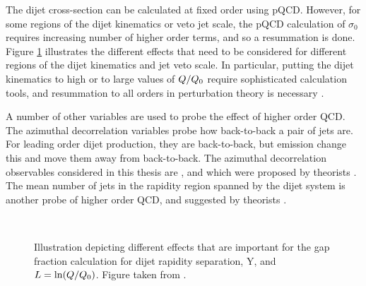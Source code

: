 The dijet cross-section can be calculated at fixed order using pQCD.
However, for some regions of the dijet kinematics or veto jet scale, the pQCD calculation of $\sigma_{0}$ requires increasing number of higher order terms, and so a resummation is done.
Figure \ref{Theory:KineRange} illustrates the different effects that need to be considered for different regions of the dijet kinematics and jet veto scale.
In particular, putting the dijet kinematics to high \dy{} or to large values of $Q/\mbox{$Q_0$}{}$ require sophisticated calculation tools, and resummation to all orders in perturbation theory is necessary \cite{ref:Jeff3,ref:HEJ1}.

A number of other variables are used to probe the effect of higher order QCD.
The azimuthal decorrelation variables probe how back-to-back a pair of jets are.
For leading order dijet production, they are back-to-back, but emission change this and move them away from back-to-back.
The azimuthal decorrelation observables considered in this thesis are \dphiDist{}, \mean{\cosdphi{}} and  \mean{\costwodphi{}} which were proposed by theorists  \cite{ref:BFKL,ref:BFKL_cos,ref:BFKL_dPhi,ref:Anderson1}.  
The mean number of jets in the rapidity region spanned by the dijet system is another probe of higher order QCD, and suggested by theorists \cite{ref:Andersen2}.



\begin{figure}
\centering
\mbox{
}
\caption[Illustration of the different effects on the gap fraction for a range of phase space ]{
Illustration depicting different effects that are important for the gap fraction calculation for dijet rapidity separation, Y, and $L=\ln(Q/\mbox{$Q_0$}{})$.
Figure taken from \cite{ref:Forshaw_Veto}.
\label{Theory:KineRange}}
\end{figure}





